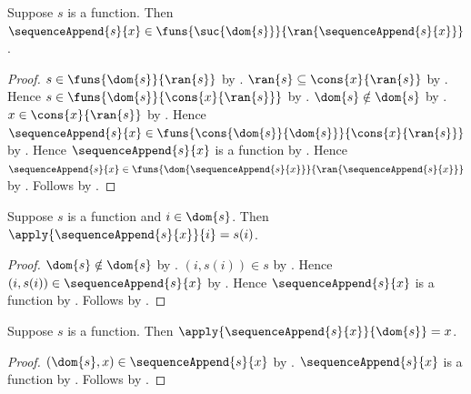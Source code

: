 \begin{proposition}\label{sequence_append_function}
    Suppose $s$ is a function.
    Then $\sequenceAppend{s}{x}\in
        \funs{\suc{\dom{s}}}{\ran{\sequenceAppend{s}{x}}}$.
\end{proposition}
\begin{proof}
    $s\in\funs{\dom{s}}{\ran{s}}$
        by .
    $\ran{s}\subseteq\cons{x}{\ran{s}}$ by .
    Hence $s\in\funs{\dom{s}}{\cons{x}{\ran{s}}}$
        by .
    $\dom{s}\notin\dom{s}$ by .
    $x\in\cons{x}{\ran{s}}$ by .
    Hence $\sequenceAppend{s}{x}\in
        \funs{\cons{\dom{s}}{\dom{s}}}{\cons{x}{\ran{s}}}$
        by .
    Hence $\sequenceAppend{s}{x}$ is a function
        by .
    Hence $\sequenceAppend{s}{x}\in
        \funs{\dom{\sequenceAppend{s}{x}}}
            {\ran{\sequenceAppend{s}{x}}}$
        by .
    Follows by .
\end{proof}

\begin{proposition}\label{sequence_append_old_value}
    Suppose $s$ is a function and $i\in\dom{s}$.
    Then $\apply{\sequenceAppend{s}{x}}{i}=s(i)$.
\end{proposition}
\begin{proof}
    $\dom{s}\notin\dom{s}$ by .
    $(i,s(i))\in s$ by .
    Hence $(i,s(i))\in\sequenceAppend{s}{x}$
        by .
    Hence $\sequenceAppend{s}{x}$ is a function
        by .
    Follows by .
\end{proof}

\begin{proposition}\label{sequence_append_last_value}
    Suppose $s$ is a function.
    Then $\apply{\sequenceAppend{s}{x}}{\dom{s}}=x$.
\end{proposition}
\begin{proof}
    $(\dom{s},x)\in\sequenceAppend{s}{x}$
        by .
    $\sequenceAppend{s}{x}$ is a function
        by .
    Follows by .
\end{proof}

